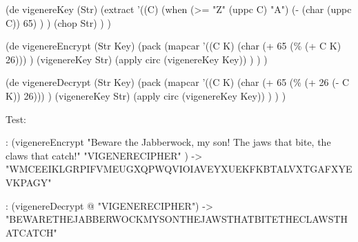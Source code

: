 \begin{wideverbatim}

(de vigenereKey (Str)
   (extract
      '((C)
         (when (>= "Z" (uppc C) "A")
            (- (char (uppc C)) 65) ) )
      (chop Str) ) )

(de vigenereEncrypt (Str Key)
   (pack
      (mapcar
         '((C K)
            (char (+ 65 (\% (+ C K) 26))) )
         (vigenereKey Str)
         (apply circ (vigenereKey Key)) ) ) )

(de vigenereDecrypt (Str Key)
   (pack
      (mapcar
         '((C K)
            (char (+ 65 (\% (+ 26 (- C K)) 26))) )
         (vigenereKey Str)
         (apply circ (vigenereKey Key)) ) ) )

Test:

: (vigenereEncrypt
   "Beware the Jabberwock, my son! The jaws that bite, the claws that catch!"
   "VIGENERECIPHER" )
-> "WMCEEIKLGRPIFVMEUGXQPWQVIOIAVEYXUEKFKBTALVXTGAFXYEVKPAGY"

: (vigenereDecrypt @ "VIGENERECIPHER")
-> "BEWARETHEJABBERWOCKMYSONTHEJAWSTHATBITETHECLAWSTHATCATCH"

\end{wideverbatim}



% 
